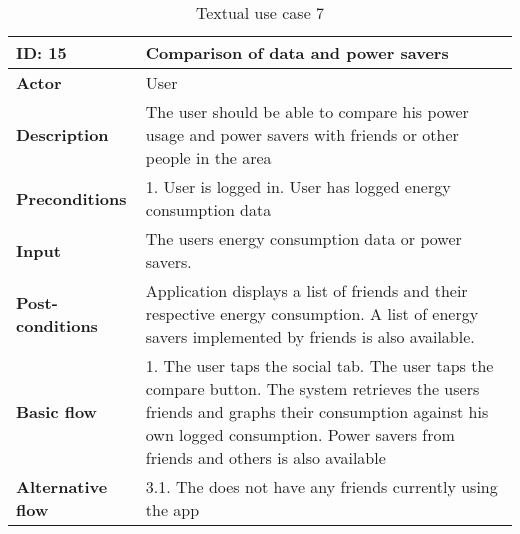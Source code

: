 \begin{table}[H]
\begin{tabular}{|l|p{11.7cm}|}
\hline
\textbf{ID: }15&\textbf{Comparison of data and power savers}
\\\hline
\textbf{Actor} &User
\\\hline
\textbf{Description}&
The user should be able to compare his power usage and power savers with friends or other people in the area\\\hline
\textbf{Preconditions}&
1. User is logged in\newline
2. User has logged energy consumption data\\\hline
\textbf{Input}&
The users energy consumption data or power savers.\\\hline
\textbf{Post-conditions}& 
Application displays a list of friends and their respective energy consumption. A list of energy savers implemented by friends is also available. \\\hline
\textbf{Basic flow}&
1. The user taps the social tab\newline
2. The user taps the compare button\newline
3. The system retrieves the users friends and graphs their consumption against his own logged consumption\newline
4. Power savers from friends and others is also available
\\\hline
\textbf{Alternative flow}&
3.1. The does not have any friends currently using the app
\\\hline
\end{tabular}
\caption{Textual use case 7}
\end{table}

